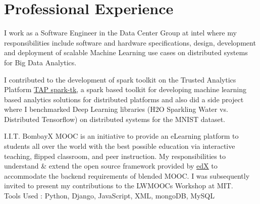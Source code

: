\documentclass[hidelinks,letterpaper]{deedy-resume-openfont} %
\begin{document}
\begin{minipage}[t]{0.66\textwidth} %




\section{Professional Experience}
{}
\small I work as a Software Engineer in the Data Center Group at intel where my responsibilities include software and hardware specifications, design, development and deployment of scalable Machine Learning use cases on distributed systems for Big Data Analytics.
\sectionsep

\small I contributed to the development of spark toolkit on the Trusted Analytics Platform \href{https://github.com/trustedanalytics/spark-tk}{\underline{TAP spark-tk}}, a spark based toolkit for developing machine learning based analytics solutions for distributed platforms and also did a side project where I benchmarked Deep Learning libraries (H2O Sparkling Water vs. Distributed Tensorflow) on distributed systems for the MNIST dataset.
\sectionsep

\small I.I.T. BombayX MOOC is an initiative to provide an eLearning platform to students all over the world with the best possible education via interactive teaching, flipped classroom, and peer instruction. My responsibilities to understand \& extend the open source framework provided by \href{https://github.com/edx/edx-platform}{\underline{edX}} to accommodate the backend requirements of blended MOOC. I was subsequently invited to present my contributions to the LWMOOCs Workshop at MIT.
\\Tools Used : Python, Django, JavaScript, XML, mongoDB, MySQL


\end{minipage}
\end{document}
